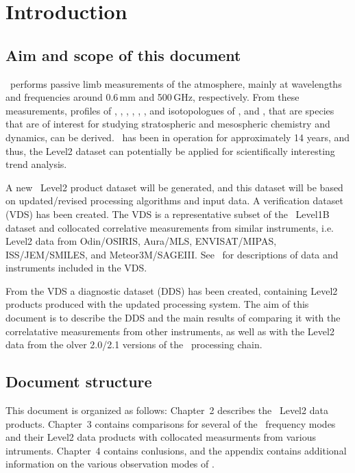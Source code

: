 \chapter{Introduction}
\label{chapter:introduction}


\setcounter{page}{1}


\section{Aim and scope of this document}
\label{sec:aim}
\smr\ performs passive limb measurements of the atmosphere, mainly at
wavelengths and frequencies around 0.6\,mm and 500\,GHz, respectively.  From
these measurements, profiles of , , ,
, , , and isotopologues of ,
and , that are species that are of interest for studying
stratospheric and mesospheric chemistry and dynamics, can be derived.  \smr\
has been in operation for approximately 14 years, and thus, the Level2 dataset
can potentially be applied for scientifically interesting trend analysis.

A new \smr\ Level2 product dataset will be generated, and this dataset will be
based on updated/revised processing algorithms and input data.  A verification
dataset (VDS) has been created. The VDS is a representative subset of the \smr\
Level1B dataset and collocated correlative measurements from similar
instruments, i.e.  Level2 data from Odin/OSIRIS, Aura/MLS, ENVISAT/MIPAS,
ISS/JEM/SMILES, and Meteor3M/SAGEIII. See~\cite{VDS:2016} for descriptions of
data and instruments included in the VDS.

From the VDS a diagnostic dataset (DDS) has been created, containing Level2
products produced with the updated processing system. The aim of this document
is to describe the DDS and the main results of comparing it with the
correlatative measurements from other instruments, as well as with the Level2
data from the olver 2.0/2.1 versions of the \smr\ processing chain.

\section{Document structure}

This document is organized as follows: Chapter~2 describes the \smr\ Level2
data products. Chapter~3 contains comparisons for several of the \smr\
frequency modes and their Level2 data products with collocated measurments from
various intruments. Chapter~4 contains conlusions, and the appendix contains
additional information on the various observation modes of \smr.
\TODO{add document structure as we go along}

